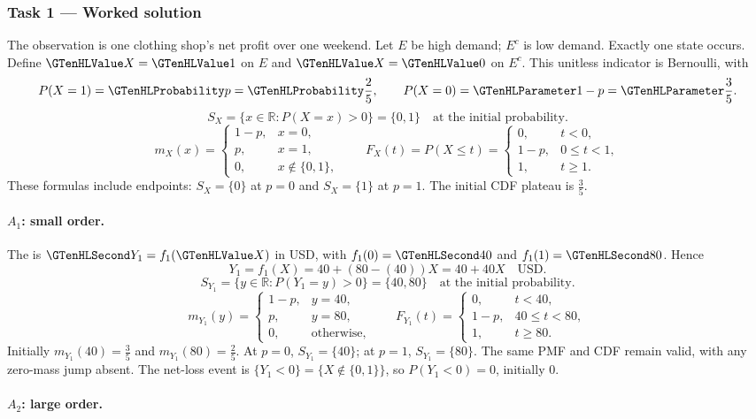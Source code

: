 \subsubsection*{Task 1 --- Worked solution}\label{sol:c3-inventory-model}
The observation is one clothing shop's net profit over one weekend. Let $E$ be high demand; $E^c$ is low demand. Exactly one state occurs. Define $\Indicator{X}=\Indicator{1}$ on $E$ and $\Indicator{X}=\Indicator{0}$ on $E^c$. This unitless indicator is Bernoulli, with
\[P(X=1)=\SuccessProb{p}=\SuccessProb{\frac{2}{5}},\qquad P(X=0)=\FailureProb{1-p}=\FailureProb{\frac{3}{5}}.\]
\[S_X=\{x\in\mathbb R:P(X=x)>0\}=\{0,1\}\quad\text{at the initial probability}.\]
\[m_X(x)=\begin{cases}1-p,&x=0,\\p,&x=1,\\0,&x\notin\{0,1\},\end{cases}\qquad F_X(t)=P(X\leq t)=\begin{cases}0,&t<0,\\1-p,&0\leq t<1,\\1,&t\geq1.\end{cases}\]
These formulas include endpoints: $S_X=\{0\}$ at $p=0$ and $S_X=\{1\}$ at $p=1$. The initial CDF plateau is $\frac{3}{5}$.
\paragraph{$A_1$: small order.}
The  is $\Money{Y_1}=f_1(\Indicator{X})$ in USD, with $f_1(0)=\Money{40}$ and $f_1(1)=\Money{80}$. Hence
\[Y_1=f_1(X)=40+(80-(40))X=40+40X\quad\text{USD}.\]
\[S_{Y_1}=\{y\in\mathbb R:P(Y_1=y)>0\}=\{40,80\}\quad\text{at the initial probability}.\]
\[m_{Y_1}(y)=\begin{cases}1-p,&y=40,\\p,&y=80,\\0,&\text{otherwise},\end{cases}\qquad F_{Y_1}(t)=\begin{cases}0,&t<40,\\1-p,&40\leq t<80,\\1,&t\geq 80.\end{cases}\]
Initially $m_{Y_1}(40)=\frac{3}{5}$ and $m_{Y_1}(80)=\frac{2}{5}$. At $p=0$, $S_{Y_1}=\{40\}$; at $p=1$, $S_{Y_1}=\{80\}$. The same PMF and CDF remain valid, with any zero-mass jump absent.
The net-loss event is $\{Y_1<0\}=\{X\notin\{0,1\}\}$, so $P(Y_1<0)=0$, initially $0$.
\paragraph{$A_2$: large order.}
